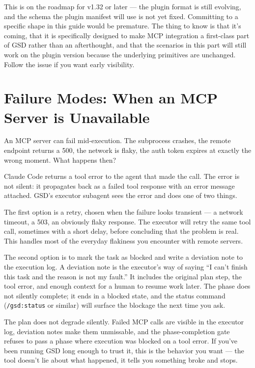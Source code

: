 \documentclass[11pt,letterpaper,openany]{book}
\begin{document}
This is on the roadmap for v1.32 or later --- the plugin format is
still evolving, and the schema the plugin manifest will use is not
yet fixed. Committing to a specific shape in this guide would be
premature. The thing to know is that it's coming, that it is
specifically designed to make MCP integration a first-class part of
GSD rather than an afterthought, and that the scenarios in this
part will still work on the plugin version because the underlying
primitives are unchanged. Follow the issue if you want early visibility.

\section{Failure Modes: When an MCP Server is Unavailable}

An MCP server can fail mid-execution. The subprocess crashes, the
remote endpoint returns a 500, the network is flaky, the auth token
expires at exactly the wrong moment. What happens then?

Claude Code returns a tool error to the agent that made the call.
The error is not silent: it propagates back as a failed tool
response with an error message attached. GSD's executor subagent
sees the error and does one of two things.

The first option is a retry, chosen when the failure looks
transient --- a network timeout, a 503, an obviously flaky response.
The executor will retry the same tool call, sometimes with a short
delay, before concluding that the problem is real. This handles
most of the everyday flakiness you encounter with remote servers.

The second option is to mark the task as blocked and write a
deviation note to the execution log. A deviation note is the
executor's way of saying ``I can't finish this task and the reason
is not my fault.'' It includes the original plan step, the tool
error, and enough context for a human to resume work later. The
phase does not silently complete; it ends in a blocked state, and
the status command (\texttt{/gsd:status} or similar) will surface
the blockage the next time you ask.

The plan does not degrade silently. Failed MCP calls are visible in
the executor log, deviation notes make them unmissable, and the
phase-completion gate refuses to pass a phase where execution was
blocked on a tool error. If you've been running GSD long enough to
trust it, this is the behavior you want --- the tool doesn't lie
about what happened, it tells you something broke and stops.
\end{document}
